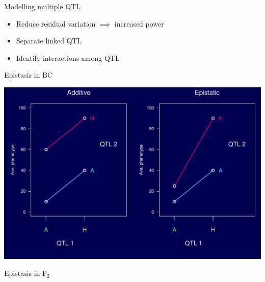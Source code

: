 \documentclass[12pt]{article}
\newcommand{\headsize}{\fontsize{35}{35} \selectfont}
\newcommand{\smallsize}{\fontsize{25}{30} \selectfont}
\begin{document}
\newpage

\headsize \color{myyellow}
\hfill \begin{minipage}{5.75in}
\centering
Modelling multiple QTL
\end{minipage}

\vspace{2cm}

\color{mywhite} \smallsize

\hfill \begin{minipage}[t]{10in}
\begin{itemize}
\itemsep24pt
\item Reduce residual variation $\implies$ increased power

\item Separate linked QTL

\item Identify interactions among QTL

\end{itemize}
\end{minipage}


\newpage

\headsize \color{myyellow}
\hfill \begin{minipage}{5.75in}
\centering
Epistasis in BC
\end{minipage}

\vfill

\centerline{\includegraphics{Figs/epistasis_bc.pdf}}


\newpage

\headsize \color{myyellow}
\hfill \begin{minipage}{5.75in}
\centering
Epistasis in F$_{\mathsf{2}}$
\end{minipage}
\end{document}
